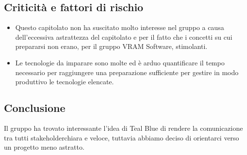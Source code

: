 \subsection{Criticità e fattori di rischio}
\begin{itemize}
	\item Questo capitolato non ha suscitato molto interesse nel gruppo a causa dell'eccessiva astrattezza del capitolato e per il fatto che i concetti su cui prepararsi non erano, per il gruppo VRAM Software, stimolanti. 
	\item Le tecnologie da imparare sono molte ed è arduo quantificare il tempo necessario per raggiungere una preparazione sufficiente per gestire in modo produttivo le tecnologie elencate.
\end{itemize}
\subsection{Conclusione}
Il gruppo ha trovato interessante l'idea di Teal Blue di rendere la comunicazione tra tutti stakeholder\glosp chiara e veloce, tuttavia abbiamo deciso di orientarci verso un progetto meno astratto.
